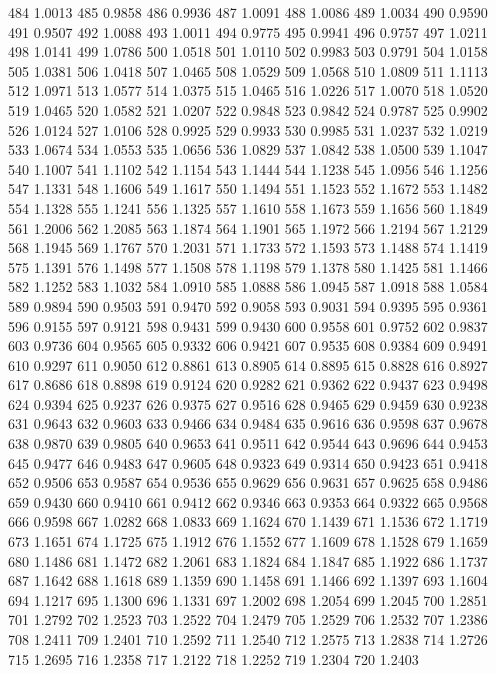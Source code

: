 484 1.0013
485 0.9858
486 0.9936
487 1.0091
488 1.0086
489 1.0034
490 0.9590
491 0.9507
492 1.0088
493 1.0011
494 0.9775
495 0.9941
496 0.9757
497 1.0211
498 1.0141
499 1.0786
500 1.0518
501 1.0110
502 0.9983
503 0.9791
504 1.0158
505 1.0381
506 1.0418
507 1.0465
508 1.0529
509 1.0568
510 1.0809
511 1.1113
512 1.0971
513 1.0577
514 1.0375
515 1.0465
516 1.0226
517 1.0070
518 1.0520
519 1.0465
520 1.0582
521 1.0207
522 0.9848
523 0.9842
524 0.9787
525 0.9902
526 1.0124
527 1.0106
528 0.9925
529 0.9933
530 0.9985
531 1.0237
532 1.0219
533 1.0674
534 1.0553
535 1.0656
536 1.0829
537 1.0842
538 1.0500
539 1.1047
540 1.1007
541 1.1102
542 1.1154
543 1.1444
544 1.1238
545 1.0956
546 1.1256
547 1.1331
548 1.1606
549 1.1617
550 1.1494
551 1.1523
552 1.1672
553 1.1482
554 1.1328
555 1.1241
556 1.1325
557 1.1610
558 1.1673
559 1.1656
560 1.1849
561 1.2006
562 1.2085
563 1.1874
564 1.1901
565 1.1972
566 1.2194
567 1.2129
568 1.1945
569 1.1767
570 1.2031
571 1.1733
572 1.1593
573 1.1488
574 1.1419
575 1.1391
576 1.1498
577 1.1508
578 1.1198
579 1.1378
580 1.1425
581 1.1466
582 1.1252
583 1.1032
584 1.0910
585 1.0888
586 1.0945
587 1.0918
588 1.0584
589 0.9894
590 0.9503
591 0.9470
592 0.9058
593 0.9031
594 0.9395
595 0.9361
596 0.9155
597 0.9121
598 0.9431
599 0.9430
600 0.9558
601 0.9752
602 0.9837
603 0.9736
604 0.9565
605 0.9332
606 0.9421
607 0.9535
608 0.9384
609 0.9491
610 0.9297
611 0.9050
612 0.8861
613 0.8905
614 0.8895
615 0.8828
616 0.8927
617 0.8686
618 0.8898
619 0.9124
620 0.9282
621 0.9362
622 0.9437
623 0.9498
624 0.9394
625 0.9237
626 0.9375
627 0.9516
628 0.9465
629 0.9459
630 0.9238
631 0.9643
632 0.9603
633 0.9466
634 0.9484
635 0.9616
636 0.9598
637 0.9678
638 0.9870
639 0.9805
640 0.9653
641 0.9511
642 0.9544
643 0.9696
644 0.9453
645 0.9477
646 0.9483
647 0.9605
648 0.9323
649 0.9314
650 0.9423
651 0.9418
652 0.9506
653 0.9587
654 0.9536
655 0.9629
656 0.9631
657 0.9625
658 0.9486
659 0.9430
660 0.9410
661 0.9412
662 0.9346
663 0.9353
664 0.9322
665 0.9568
666 0.9598
667 1.0282
668 1.0833
669 1.1624
670 1.1439
671 1.1536
672 1.1719
673 1.1651
674 1.1725
675 1.1912
676 1.1552
677 1.1609
678 1.1528
679 1.1659
680 1.1486
681 1.1472
682 1.2061
683 1.1824
684 1.1847
685 1.1922
686 1.1737
687 1.1642
688 1.1618
689 1.1359
690 1.1458
691 1.1466
692 1.1397
693 1.1604
694 1.1217
695 1.1300
696 1.1331
697 1.2002
698 1.2054
699 1.2045
700 1.2851
701 1.2792
702 1.2523
703 1.2522
704 1.2479
705 1.2529
706 1.2532
707 1.2386
708 1.2411
709 1.2401
710 1.2592
711 1.2540
712 1.2575
713 1.2838
714 1.2726
715 1.2695
716 1.2358
717 1.2122
718 1.2252
719 1.2304
720 1.2403
